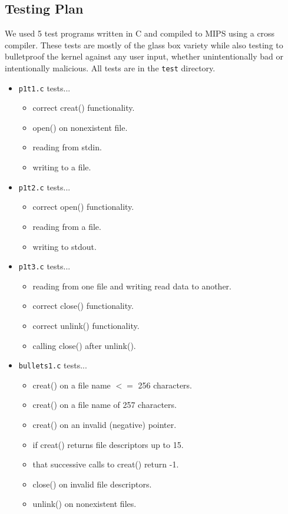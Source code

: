 \subsection{Testing Plan}
We used 5 test programs written in C and compiled to MIPS using a cross compiler. These tests are mostly of the glass box variety while also testing to bulletproof the kernel against any user input, whether unintentionally bad or intentionally malicious. All tests are in the \texttt{test} directory.
\begin{itemize}
\item \texttt{p1t1.c} tests... \begin{itemize}
\item correct creat() functionality.
\item open() on nonexistent file.
\item reading from stdin.
\item writing to a file.
\end{itemize}
\item \texttt{p1t2.c} tests... \begin{itemize}
\item correct open() functionality.
\item reading from a file.
\item writing to stdout.
\end{itemize}
\item \texttt{p1t3.c} tests... \begin{itemize}
\item reading from one file and writing read data to another.
\item correct close() functionality.
\item correct unlink() functionality.
\item calling close() after unlink().
\end{itemize}
\item \texttt{bullets1.c} tests... \begin{itemize}
\item creat() on a file name $<=$ 256 characters.
\item creat() on a file name of 257 characters.
\item creat() on an invalid (negative) pointer.
\item if creat() returns file descriptors up to 15.
\item that successive calls to creat() return -1.
\item close() on invalid file descriptors.
\item unlink() on nonexistent files.

\end{itemize}
\end{itemize}
